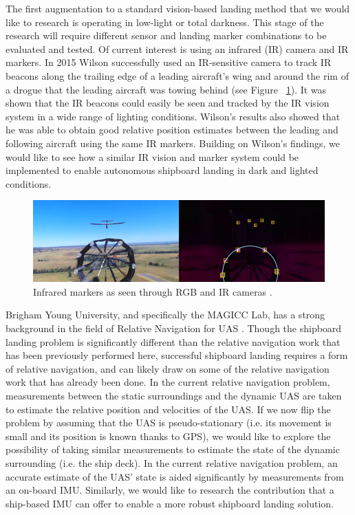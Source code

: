 \documentclass[12pt, letterpaper]{article}
\begin{document}
The first augmentation to a standard vision-based landing method that we would like to research is operating in low-light or total darkness.  This stage of the research will require different sensor and landing marker combinations to be evaluated and tested.  Of current interest is using an infrared (IR) camera and IR markers.  In 2015 Wilson \cite{WilsonDB.2015} successfully used an IR-sensitive camera to track IR beacons along the trailing edge of a leading aircraft's wing and around the rim of a drogue that the leading aircraft was towing behind (see Figure ~\ref{fig:irmarkers}).  It was shown that the IR beacons could easily be seen and tracked by the IR vision system in a wide range of lighting conditions.  Wilson's results also showed that he was able to obtain good relative position estimates between the leading and following aircraft using the same IR markers.  Building on Wilson's findings, we would like to see how a similar IR vision and marker system could be implemented to enable autonomous shipboard landing in dark and lighted conditions. 

\begin{figure}[t] %
   \centering
   \includegraphics[trim = 0mm 0mm 0mm 0mm,clip,width=6in]{ir_drogue.png}
   \caption{Infrared markers as seen through RGB and IR cameras \cite{WilsonDB.2015}.}
   \label{fig:irmarkers}
\end{figure}

Brigham Young University, and specifically the MAGICC Lab, has a strong background in the field of Relative Navigation for UAS \cite{Leishman2013}.  Though the shipboard landing problem is significantly different than the relative navigation work that has been previously performed here, successful shipboard landing requires a form of relative navigation, and can likely draw on some of the relative navigation work that has already been done.  In the current relative navigation problem, measurements between the static surroundings and the dynamic UAS are taken to estimate the relative position and velocities of the UAS.  If we now flip the problem by assuming that the UAS is pseudo-stationary (i.e. its movement is small and its position is known thanks to GPS), we would like to explore the possibility of taking similar measurements to estimate the state of the dynamic surrounding (i.e. the ship deck). In the current relative navigation problem, an accurate estimate of the UAS' state is aided significantly by measurements from an on-board IMU. Similarly, we would like to research the contribution that a ship-based IMU can offer to enable a more robust shipboard landing solution.
\end{document}

